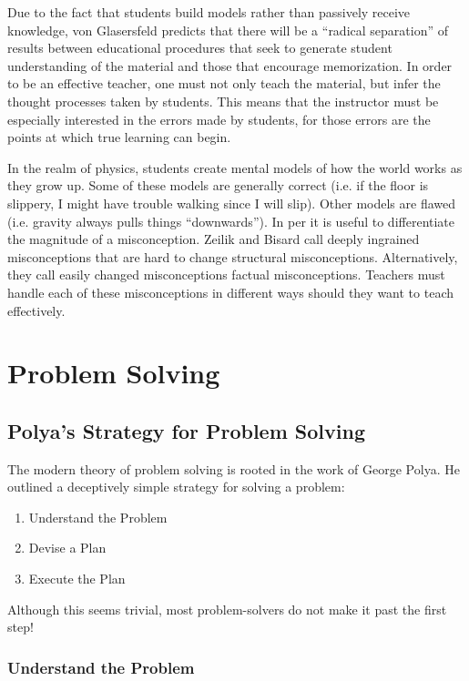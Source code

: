 Due to the fact that students build models rather than passively receive knowledge, von Glasersfeld predicts that there will be a ``radical separation'' of results between educational procedures that seek to generate student understanding of the material and those that encourage memorization. In order to be an effective teacher, one must not only teach the material, but infer the thought processes taken by students. This means that the instructor must be especially interested in the errors made by students, for those errors are the points at which true learning can begin\cite{vonGlasersfeld1996}.

In the realm of physics, students create mental models of how the world works as they grow up. Some of these models are generally correct (i.e. if the floor is slippery, I might have trouble walking since I will slip). Other models are flawed (i.e. gravity always pulls things ``downwards''). In \gls{per} it is useful to differentiate the magnitude of a misconception. Zeilik and Bisard call deeply ingrained misconceptions that are hard to change structural misconceptions. Alternatively, they call easily changed misconceptions factual misconceptions\cite{zeilik2000}. Teachers must handle each of these misconceptions in different ways should they want to teach effectively.

\section{Problem Solving}

\subsection{Polya's Strategy for Problem Solving}

The modern theory of problem solving is rooted in the work of George Polya\cite{polya1985}. He outlined a deceptively simple strategy for solving a problem:

\begin{enumerate}
\item Understand the Problem
\item Devise a Plan
\item Execute the Plan
\end{enumerate}

Although this seems trivial, most problem-solvers do not make it past the first step!

\subsubsection{Understand the Problem}

